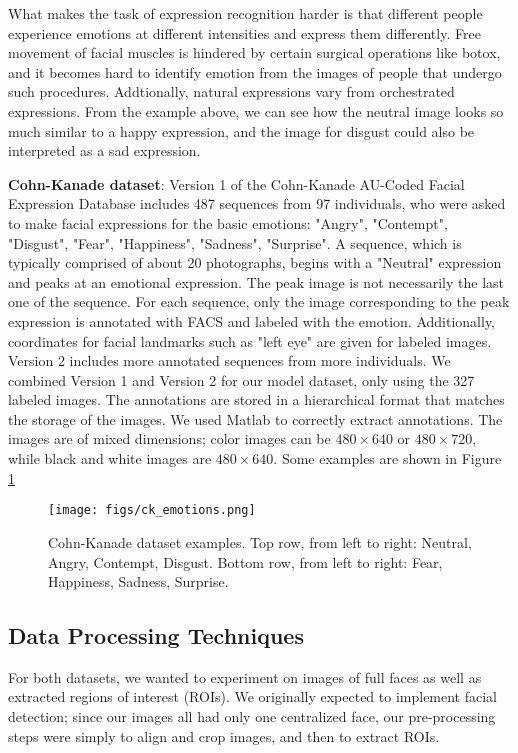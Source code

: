 \documentclass[10pt,twocolumn,letterpaper]{article}
\begin{document}
What makes the task of expression recognition harder is that different people experience emotions at different intensities and express them differently. Free movement of facial muscles is hindered by certain surgical operations like botox, and it becomes hard to identify emotion from the images of people that undergo such procedures. Addtionally, natural expressions vary from orchestrated expressions. From the example above, we can see how the neutral image looks so much similar to a happy expression, and the image for disgust could also be interpreted as a sad expression.

\textbf{Cohn-Kanade dataset}: Version 1 of the Cohn-Kanade AU-Coded Facial Expression Database \cite{ck} includes 487 sequences from 97 individuals, who were asked to make facial expressions for the basic emotions: "Angry", "Contempt", "Disgust", "Fear", "Happiness", "Sadness", "Surprise". A sequence, which is typically comprised of about 20 photographs, begins with a "Neutral" expression and peaks at an emotional expression. The peak image is not necessarily the last one of the sequence. For each sequence, only the image corresponding to the peak expression is annotated with FACS and labeled with the emotion. Additionally, coordinates for facial landmarks such as "left eye" are given for labeled images. Version 2 includes more annotated sequences from more individuals. We combined Version 1 and Version 2 for our model dataset, only using the 327 labeled images. The annotations are stored in a hierarchical format that matches the storage of the images. We used Matlab to correctly extract annotations. The images are of mixed dimensions; color images can be $480\times640$ or $480\times720$, while black and white images are $480\times640$. Some examples are shown in Figure \ref{fig:ck_examples}

\begin{figure}[h]
\texttt{[image: figs/ck\_emotions.png]}
\caption{Cohn-Kanade dataset examples. Top row, from left to right: Neutral, Angry, Contempt, Disgust. Bottom row, from left to right: Fear, Happiness, Sadness, Surprise.}
\label{fig:ck_examples}
\end{figure}

\subsection{Data Processing Techniques}
For both datasets, we wanted to experiment on images of full faces as well as extracted regions of interest (ROIs). We originally expected to implement facial detection; since our images all had only one centralized face, our pre-processing steps were simply to align and crop images, and then to extract ROIs.
\end{document}

